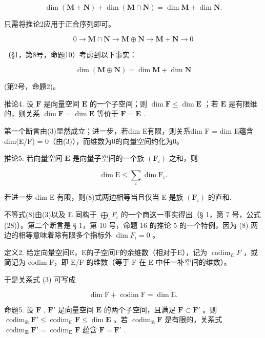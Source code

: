 \[
\dim (\mathbf {M} + \mathbf {N}) + \dim (\mathbf {M} \cap \mathbf {N}) = \dim \mathbf {M} + \dim \mathbf {N}.\tag{7}
\]

只需将推论2应用于正合序列即可。

\[
0 \rightarrow \mathbf {M} \cap \mathbf {N} \rightarrow \mathbf {M} \oplus \mathbf {N} \rightarrow \mathbf {M} + \mathbf {N} \rightarrow 0
\]

（§1，第8号，命题10）考虑到以下事实：

\[
\dim (\mathbf {M} \oplus \mathbf {N}) = \dim \mathbf {M} + \dim \mathbf {N}
\]

(第2号，命题2)。

推论4. 设 \(\mathbf{F}\) 是向量空间 \(\mathbf{E}\) 的一个子空间；则 \(\dim \mathbf{F} \leqslant \dim \mathbf{E}\) ；若 \(\mathbf{E}\) 是有限维的，则关系 \(\dim \mathbf{F} = \dim \mathbf{E}\) 等价于 \(\mathbf{F} = \mathbf{E}\) .

第一个断言由(3)显然成立；进一步，若dim E有限，则关系dim F = dim E蕴含dim(E/F) = 0（由(3)），而维数为0的向量空间约化为0。

推论5. 若向量空间 \(\mathbf{E}\) 是向量子空间的一个族 \((\mathbf{F}_{\iota})\) 之和，则

\[
\dim \mathrm{E} \leqslant \sum_ {\iota} \dim \mathrm{F} _ {\iota}.\tag{8}
\]

若进一步 dim E 有限，则(8)式两边相等当且仅当 E 是族 \((\mathbf{F}_{\iota})\) 的直和.

不等式(8)由(3)以及 E 同构于 \(\bigoplus_{\iota} F_{\iota}\) 的一个商这一事实得出（§ 1，第 7 号，公式 (28)）。第二个断言是 § 1，第 10 号，命题 16 的推论 5 的一个特例，因为 (8) 两边的相等意味着除有限多个指标外 \(\dim F_{\iota} = 0\) 。

定义2. 给定向量空间E，E的子空间F的余维数（相对于E），记为 \(\operatorname{codim}_{E} F\) ，或简记为 codim F，即 E/F 的维数（等于 F 在 E 中任一补空间的维数）。

于是关系式 (3) 可写成

\[
\dim \mathrm{F} + \operatorname{codim} \mathrm{F} = \dim \mathrm{E}.\tag{9}
\]

命题5. 设 \(\mathbf{F}\) , \(\mathbf{F}'\) 是向量空间 \(\mathbf{E}\) 的两个子空间，且满足 \(\mathbf{F} \subset \mathbf{F}'\) 。则 \(\operatorname{codim}_{\mathbf{E}} \mathbf{F}' \leqslant \operatorname{codim}_{\mathbf{E}} \mathbf{F} \leqslant \dim \mathbf{E}\) 。若 \(\operatorname{codim}_{\mathbf{E}} \mathbf{F}\) 是有限的，关系式 \(\operatorname{codim}_{\mathbf{E}} \mathbf{F}' = \operatorname{codim}_{\mathbf{E}} \mathbf{F}\) 蕴含 \(\mathbf{F} = \mathbf{F}'\) .

